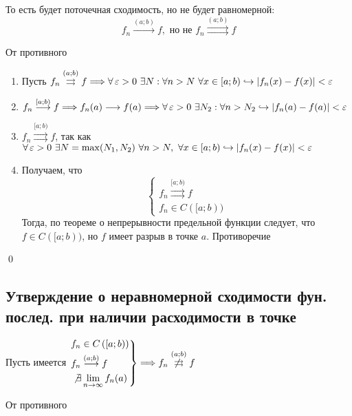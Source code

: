 \documentclass[a4paper]{article}
\begin{document}
То есть будет поточечная сходимость, но не будет равномерной:
\begin{equation*}
    f_n\overset{(a;b)}{\longrightarrow}f,\text{ но не }f_n\overset{(a;b)}{\rightrightarrows} f
\end{equation*}

\proof От противного

\begin{enumerate}
    \item Пусть $f_n\overset{(a;b)}{\rightrightarrows} f\Longrightarrow \forall\operatorname{\varepsilon}>0\ \exists N:\forall n>N\ \forall x\in [a;b)\hookrightarrow|f_n(x)-f(x)|<\operatorname{\varepsilon}$
    \item $f_n\overset{[a;b)}{\longrightarrow} f \Longrightarrow f_n(a)\longrightarrow f(a)\Longrightarrow\forall\operatorname{\varepsilon}>0\ \exists N_2:\forall n>N_2\hookrightarrow|f_n(a)-f(a)|<\operatorname{\varepsilon}$
    \item $f_n\overset{[a;b)}{\rightrightarrows} f$, так как $\forall\operatorname{\varepsilon}>0\ \exists N=\max(N_1,N_2)\ \forall n>N,\ \forall x\in [a;b) \hookrightarrow|f_n(x)-f(x)|<\operatorname{\varepsilon}$
    \item Получаем, что 
    \begin{equation*}
        \begin{cases}
            f_n\overset{[a;b)}{\rightrightarrows} f\\
            f_n\in C([a;b))
        \end{cases}
    \end{equation*}
    Тогда, по теореме о непрерывности предельной функции следует, что $f\in C([a;b))$, но $f$ имеет разрыв в точке $a$. Противоречие
\end{enumerate}\qed

\subsection{Утверждение о неравномерной сходимости фун. послед. при наличии расходимости в точке}
\theorem Пусть имеется $\left.\begin{aligned}
    &f_n\in C\left([a;b)\right)\\
    &f_n\overset{(a;b)}{\longrightarrow} f\\
    &\not\exists \lim\limits_{n\to\infty}f_n(a)
\end{aligned}\right\}\Longrightarrow f_n\overset{(a;b)}{\not\rightrightarrows} f$

\proof От противного
\end{document}
